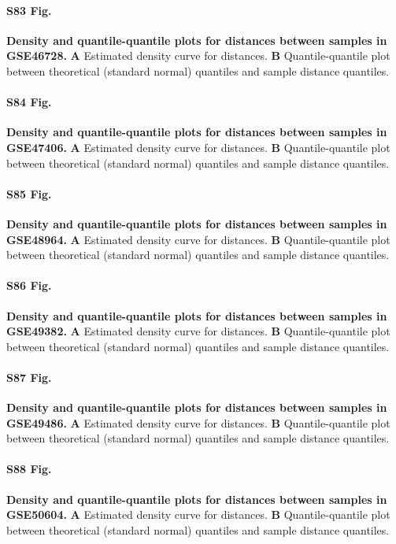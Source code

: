 \documentclass[10pt,letterpaper]{article}
\begin{document}
\paragraph*{S83 Fig.}
\hypertarget{S83_Fig}{
{\bf Density and quantile-quantile plots for distances between samples in GSE46728.} \textbf{A} Estimated density curve for distances. \textbf{B} Quantile-quantile plot between theoretical (standard normal) quantiles and sample distance quantiles.}

\paragraph*{S84 Fig.}
\hypertarget{S84_Fig}{
{\bf Density and quantile-quantile plots for distances between samples in GSE47406.} \textbf{A} Estimated density curve for distances. \textbf{B} Quantile-quantile plot between theoretical (standard normal) quantiles and sample distance quantiles.}

\paragraph*{S85 Fig.}
\hypertarget{S85_Fig}{
{\bf Density and quantile-quantile plots for distances between samples in GSE48964.} \textbf{A} Estimated density curve for distances. \textbf{B} Quantile-quantile plot between theoretical (standard normal) quantiles and sample distance quantiles.}

\paragraph*{S86 Fig.}
\hypertarget{S86_Fig}{
{\bf Density and quantile-quantile plots for distances between samples in GSE49382.} \textbf{A} Estimated density curve for distances. \textbf{B} Quantile-quantile plot between theoretical (standard normal) quantiles and sample distance quantiles.}

\paragraph*{S87 Fig.}
\hypertarget{S87_Fig}{
{\bf Density and quantile-quantile plots for distances between samples in GSE49486.} \textbf{A} Estimated density curve for distances. \textbf{B} Quantile-quantile plot between theoretical (standard normal) quantiles and sample distance quantiles.}

\paragraph*{S88 Fig.}
\hypertarget{S88_Fig}{
{\bf Density and quantile-quantile plots for distances between samples in GSE50604.} \textbf{A} Estimated density curve for distances. \textbf{B} Quantile-quantile plot between theoretical (standard normal) quantiles and sample distance quantiles.}
\end{document}
